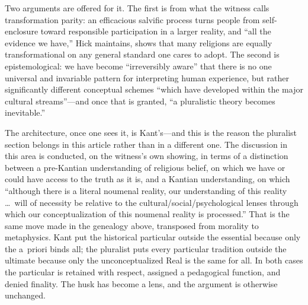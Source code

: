 Two arguments are offered for it. The first is from what the witness calls transformation parity: an efficacious salvific process turns people from self-enclosure toward responsible participation in a larger reality, and ``all the evidence we have,'' Hick maintains, shows that many religions are equally transformational on any general standard one cares to adopt. The second is epistemological: we have become ``irreversibly aware'' that there is no one universal and invariable pattern for interpreting human experience, but rather significantly different conceptual schemes ``which have developed within the major cultural streams''---and once that is granted, ``a pluralistic theory becomes inevitable.''

The architecture, once one sees it, is Kant's---and this is the reason the pluralist section belongs in this article rather than in a different one. The discussion in this area is conducted, on the witness's own showing, in terms of a distinction between a pre-Kantian understanding of religious belief, on which we have or could have access to the truth as it is, and a Kantian understanding, on which ``although there is a literal noumenal reality, our understanding of this reality \ldots\ will of necessity be relative to the cultural/social/psychological lenses through which our conceptualization of this noumenal reality is processed.'' That is the same move made in the genealogy above, transposed from morality to metaphysics. Kant put the historical particular outside the essential because only the a~priori binds all; the pluralist puts every particular tradition outside the ultimate because only the unconceptualized Real is the same for all. In both cases the particular is retained with respect, assigned a pedagogical function, and denied finality. The husk has become a lens, and the argument is otherwise unchanged.

